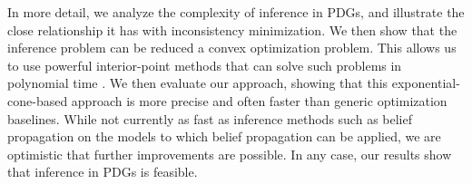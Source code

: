 \documentclass[twoside]{article}
\begin{document}
In more detail,
we analyze the complexity of inference in PDGs, and illustrate
the close relationship it has with inconsistency minimization.
We then show that the inference problem can be reduced a convex
optimization problem.
This allows us to use powerful interior-point methods
that can solve such problems in polynomial time \parencite{dahl2022primal}. 
We then evaluate our approach, showing 
that this exponential-cone-based approach is more precise
and often faster than generic optimization baselines.
While not currently as fast as inference methods such as belief
propagation on the models to which belief propagation can be applied,
we are optimistic that further improvements are possible.
In any case, our results show that inference in PDGs is feasible.
\end{document}
